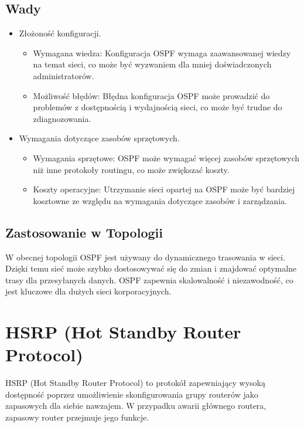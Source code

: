 \subsection{Wady}
\begin{itemize}
    \item Złożoność konfiguracji.
    \begin{itemize}
        \item Wymagana wiedza: Konfiguracja OSPF wymaga zaawansowanej wiedzy na temat sieci, co może być wyzwaniem dla mniej doświadczonych administratorów.
        \item Możliwość błędów: Błędna konfiguracja OSPF może prowadzić do problemów z dostępnością i wydajnością sieci, co może być trudne do zdiagnozowania.
    \end{itemize}
    \item Wymagania dotyczące zasobów sprzętowych.
    \begin{itemize}
        \item Wymagania sprzętowe: OSPF może wymagać więcej zasobów sprzętowych niż inne protokoły routingu, co może zwiększać koszty.
        \item Koszty operacyjne: Utrzymanie sieci opartej na OSPF może być bardziej kosztowne ze względu na wymagania dotyczące zasobów i zarządzania.
    \end{itemize}
\end{itemize}

\subsection{Zastosowanie w Topologii}
W obecnej topologii OSPF jest używany do dynamicznego trasowania w sieci. Dzięki temu sieć może szybko dostosowywać się do zmian i znajdować optymalne trasy dla przesyłanych danych. OSPF zapewnia skalowalność i niezawodność, co jest kluczowe dla dużych sieci korporacyjnych.

\section{HSRP (Hot Standby Router Protocol)}

HSRP (Hot Standby Router Protocol) to protokół zapewniający wysoką dostępność poprzez umożliwienie skonfigurowania grupy routerów jako zapasowych dla siebie nawzajem. W przypadku awarii głównego routera, zapasowy router przejmuje jego funkcje.

